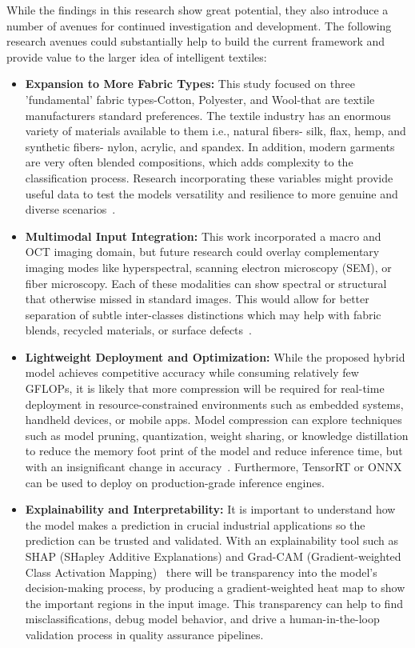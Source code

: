 While the findings in this research show great potential, they also introduce a number of avenues for continued investigation and development. The following research avenues could substantially help to build the current framework and provide value to the larger idea of intelligent textiles: 

\begin{itemize}
    \item \textbf{Expansion to More Fabric Types:} This study focused on three 'fundamental' fabric types-Cotton, Polyester, and Wool-that are textile manufacturers standard preferences. The textile industry has an enormous variety of materials available to them i.e., natural fibers- silk, flax, hemp, and synthetic fibers- nylon, acrylic, and spandex. In addition, modern garments are very often blended compositions, which adds complexity to the classification process. Research incorporating these variables might provide useful data to test the models versatility and resilience to more genuine and diverse scenarios~\cite{kampouris2016fine}.
    
    \item \textbf{Multimodal Input Integration:} This work incorporated a macro and OCT imaging domain, but future research could overlay complementary imaging modes like hyperspectral, scanning electron microscopy (SEM), or fiber microscopy. Each of these modalities can show spectral or structural that otherwise missed in standard images. This would allow for better separation of subtle inter-classes distinctions which may help with fabric blends, recycled materials, or surface defects~\cite{sabuncu2022optical}.
    
    \item \textbf{Lightweight Deployment and Optimization:} While the proposed hybrid model achieves competitive accuracy while consuming relatively few GFLOPs, it is likely that more compression will be required for real-time deployment in resource-constrained environments such as embedded systems, handheld devices, or mobile apps. Model compression can explore techniques such as model pruning, quantization, weight sharing, or knowledge distillation to reduce the memory foot print of the model and reduce inference time, but with an insignificant change in accuracy~\cite{touvron2021training}. Furthermore, TensorRT or ONNX can be used to deploy on production-grade inference engines. 

    \item \textbf{Explainability and Interpretability:} It is important to understand how the model makes a prediction in crucial industrial applications so the prediction can be trusted and validated. With an explainability tool such as SHAP (SHapley Additive Explanations) and Grad-CAM (Gradient-weighted Class Activation Mapping)~\cite{selvaraju2017grad} there will be transparency into the model’s decision-making process, by producing a gradient-weighted heat map to show the important regions in the input image. This transparency can help to find misclassifications, debug model behavior, and drive a human-in-the-loop validation process in quality assurance pipelines.


\end{itemize}
